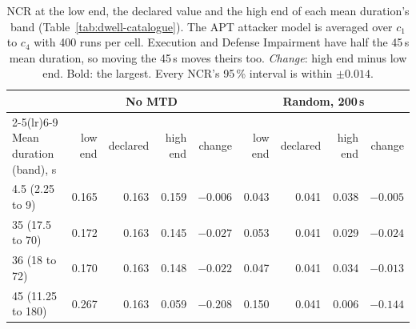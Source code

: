 
\begin{table}[htbp]
\centering
\caption[NCR at the ends of each mean duration's band]{NCR at the low end, the declared value and the high end of each mean duration's band (Table~\ref{tab:dwell-catalogue}). The APT attacker model is averaged over $c_1$ to $c_4$ with 400 runs per cell. Execution and Defense Impairment have half the 45\,s mean duration, so moving the 45\,s moves theirs too. \emph{Change}: high end minus low end. Bold: the largest. Every NCR's 95\,\% interval is within $\pm 0.014$.}
\label{tab:anchor-sensitivity}
\tablestyle\setlength{\tabcolsep}{4pt}
\begin{tabular}{@{}l*{8}{r}@{}}
\toprule
& \multicolumn{4}{c}{No MTD} & \multicolumn{4}{c}{Random, 200\,s} \\
\cmidrule(lr){2-5}\cmidrule(lr){6-9}
\rowcolor{white}Mean duration (band), s & low end & declared & high end & change & low end & declared & high end & change \\
\midrule
4.5 (2.25 to 9) & 0.165 & 0.163 & 0.159 & $-0.006$ & 0.043 & 0.041 & 0.038 & $-0.005$ \\
35 (17.5 to 70) & 0.172 & 0.163 & 0.145 & $-0.027$ & 0.053 & 0.041 & 0.029 & $-0.024$ \\
36 (18 to 72) & 0.170 & 0.163 & 0.148 & $-0.022$ & 0.047 & 0.041 & 0.034 & $-0.013$ \\
45 (11.25 to 180) & 0.267 & 0.163 & 0.059 & $\mathbf{-0.208}$ & 0.150 & 0.041 & 0.006 & $\mathbf{-0.144}$ \\
\bottomrule
\end{tabular}
\end{table}
